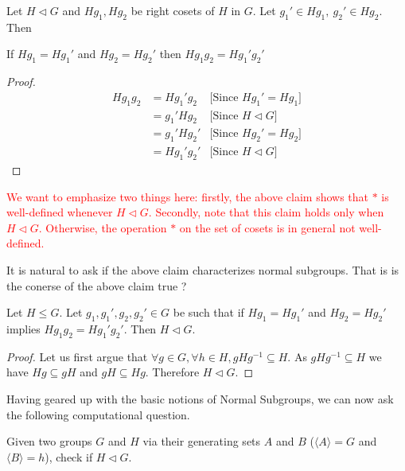 \begin{claim}
Let $H\triangleleft G$ and $Hg_1,Hg_2$ be right cosets of $H$ in $G$. Let $g_1'\in Hg_1,~g_2'\in Hg_2$. Then 
\begin{center}
If $Hg_1=Hg_1'$ and $Hg_2=Hg_2'$ then $Hg_1g_2 = Hg_1'g_2' $
\end{center} 
\end{claim}
\begin{proof}
\begin{eqnarray*}
Hg_1g_2 &= Hg_1'g_2  & \text{[Since $Hg_1'= Hg_1$]}\\
&= g_1'Hg_2 & \text{[Since $H\triangleleft G$]}\\
&= g_1'Hg_2' & \text{[Since $Hg_2'= Hg_2$]}\\
&= Hg_1'g_2' & \text{[Since $H\triangleleft G$]}
\end{eqnarray*}
\end{proof}

\textcolor{red}{
We want to emphasize two things here: firstly, the above claim shows that $*$ is well-defined whenever $H\triangleleft G$. Secondly, note that this claim holds only when $H\triangleleft G$. Otherwise, the operation $*$ on the set of cosets is in general not well-defined. 
}


It is natural to ask if the above claim characterizes normal subgroups. That is is the conerse of the above claim true ? 

\begin{claim}
Let $H\leq G$. Let $g_1,g_1',g_2,g_2'\in G$ be such that if $Hg_1=Hg_1'$ and $Hg_2=Hg_2'$ implies $Hg_1g_2 = Hg_1'g_2'$. Then $H\triangleleft G$.
\end{claim}
\begin{proof}
Let us first argue that $\forall g\in G,\forall h\in H, gHg^{-1}\subseteq H$.
As $gHg^{-1}\subseteq H$ we have $Hg\subseteq gH$ and $gH\subseteq Hg$. Therefore $H\triangleleft G$.
\end{proof}
Having geared up with the basic notions of Normal Subgroups, we can now ask the following computational question.
\begin{problem}\label{2}
	Given two groups $G$ and $H$ via their generating sets $A$ and $B$ ($\langle A\rangle=G$ and $\langle B\rangle=h$), check if $H\triangleleft G$.
\end{problem}
